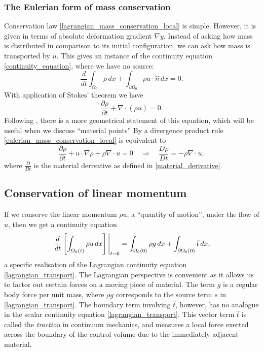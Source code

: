 \documentclass[11pt,a4paper]{memoir}
\newcommand{\omn}{{\Omega_0}}
\newcommand{\pomn}{{\partial\Omega_0}}
\newcommand{\Part}[2]{\frac{\partial #1}{\partial #2}}
\begin{document}
\subsubsection{The Eulerian form of mass conservation}
Conservation law \eqref{lagrangian_mass_conservation_local} is simple. However, it is given in terms of absolute deformation gradient $\nabla y$.
Instead of asking how mass is distributed
in comparison to its initial configuration, we can ask how mass is transported by $u$.
This gives an instance of the continuity equation \eqref{continuity_equation}, where we have no source:
\begin{equation}\label{eulerian_mass_conservation}
    \frac{d}{dt} \int_{\omn} \rho \,dx + \int_{\pomn} \rho u\cdot \hat{n}\,dx = 0.
\end{equation}
With application of Stokes' theorem we have
\begin{equation}\label{eulerian_mass_conservation_local}
    \Part{\rho}{t} + \nabla \cdot (\rho u) = 0.
\end{equation}
Following \cite{leal}, there is a more geometrical statement of this equation, which will be useful when
we discuss ``material points''
By a divergence product rule \eqref{eulerian_mass_conservation_local} is equivalent to
\begin{equation}\label{eulerian_mass_conservation_local_material}
    \Part{\rho}{t} + u\cdot\nabla\rho + \rho\nabla\cdot u = 0
    \quad\Rightarrow\quad \frac{D\rho}{Dt} = -\rho\nabla\cdot u,
\end{equation}
where $\frac{D}{Dt}$ is the material derivative as defined in \eqref{material_derivative}.

\subsection{Conservation of linear momentum}

If we conserve the linear momentum $\rho u$, a ``quantity of motion'', under the flow of $u$, then we get a continuity equation
\begin{equation}\label{cauchy_continuity_traction}
    \eval{\frac{d}{dt}\left[\int_{\Omega_0(t)}\rho u\,dx\right]}_{t=0} = \int_{\omn(0)} \rho g\,dx + \int_{\pomn(0)}\hat{t}\,dx,
\end{equation}
a specific realisation of the Lagrangian continuity equation \eqref{lagrangian_transport}. The Lagrangian perspective is convenient
as it allows us to factor out certain forces on a moving piece of material. The term $g$ is a regular body force per unit mass, where $\rho g$ corresponds to
the source term $s$ in \eqref{lagrangian_transport}. The boundary term involving $\hat{t}$, however, has no analogue in the scalar continuity equation
\eqref{lagrangian_transport}.
This vector term $\hat{t}$ is called the \textit{traction} in continuum mechanics, and measures a local force exerted across the boundary
of the control volume due to the immediately adjacent material.
\end{document}
